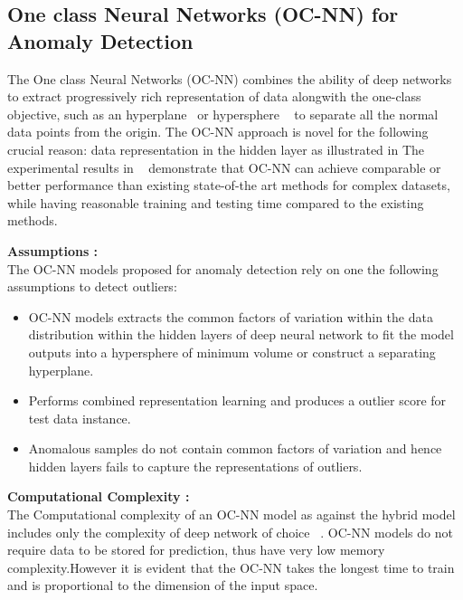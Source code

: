 \subsection{One class Neural Networks (OC-NN) for Anomaly Detection}
\label{sec:oneclassNN}
The One class Neural Networks  (OC-NN) combines the ability of deep networks to extract progressively rich representation of data alongwith the one-class objective, such as an hyperplane~\cite{chalapathy2018anomaly} or hypersphere ~\cite{ruff2018deep} to separate all the normal data points from the origin. The OC-NN approach is novel for the following crucial reason: data representation in the hidden layer as illustrated in
The experimental results in ~\cite{chalapathy2018anomaly,ruff2018deep} demonstrate that OC-NN can achieve comparable or better performance than existing state-of-the art methods for complex datasets, while having reasonable training and testing time compared to the existing methods.

\textbf{Assumptions : } \\
The OC-NN models proposed for anomaly detection rely on one the following assumptions to detect outliers:
\begin{itemize}
 \item  OC-NN models extracts the common factors of variation within the data distribution within the hidden layers of deep neural network to fit the model outputs into a hypersphere of minimum volume or construct a separating hyperplane.
  \item Performs combined representation learning and produces a outlier score for test data instance.
  \item Anomalous samples do not contain common factors of variation and hence hidden layers fails to capture the representations of outliers.
\end{itemize}

\textbf{Computational Complexity :} \\
The Computational complexity of an OC-NN model as against the  hybrid model includes only the complexity of deep network of choice ~\cite{saxe2011random}. OC-NN models do not require  data to be
stored for prediction, thus have very low memory complexity.However  it is evident that the OC-NN takes the longest time to train and is proportional to the dimension of the input space.

